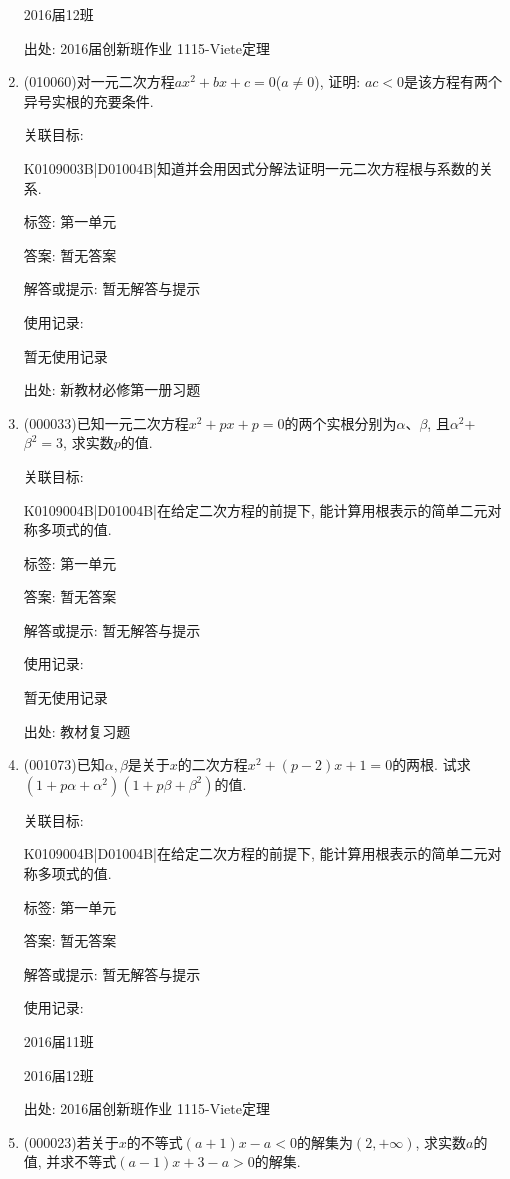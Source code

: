 \documentclass[10pt,a4paper]{article}
\begin{document}
\begin{enumerate}[1.]
2016届12班	


出处: 2016届创新班作业	1115-Viete定理
\item { (010060)}对一元二次方程$ax^2+bx+c=0$($a\ne 0$), 证明: $ac<0$是该方程有两个异号实根的充要条件.


关联目标:

K0109003B|D01004B|知道并会用因式分解法证明一元二次方程根与系数的关系.



标签: 第一单元

答案: 暂无答案

解答或提示: 暂无解答与提示

使用记录:

暂无使用记录


出处: 新教材必修第一册习题
\item { (000033)}已知一元二次方程$x^2+px+p=0$的两个实根分别为$\alpha$、$\beta$, 且$\alpha^2$+$\beta^2=3$, 求实数$p$的值.


关联目标:

K0109004B|D01004B|在给定二次方程的前提下, 能计算用根表示的简单二元对称多项式的值.



标签: 第一单元

答案: 暂无答案

解答或提示: 暂无解答与提示

使用记录:

暂无使用记录


出处: 教材复习题
\item { (001073)}已知$\alpha,\beta$是关于$x$的二次方程$x^2+(p-2)x+1=0$的两根. 试求$(1+p\alpha+\alpha^2)(1+p\beta+\beta^2)$的值.


关联目标:

K0109004B|D01004B|在给定二次方程的前提下, 能计算用根表示的简单二元对称多项式的值.



标签: 第一单元

答案: 暂无答案

解答或提示: 暂无解答与提示

使用记录:

2016届11班	

2016届12班	


出处: 2016届创新班作业	1115-Viete定理
\item { (000023)}若关于$x$的不等式$(a+1)x-a<0$的解集为$(2,+\infty)$, 求实数$a$的值, 并求不等式$(a-1)x+3-a>0$的解集.



\end{enumerate}
\end{document}
